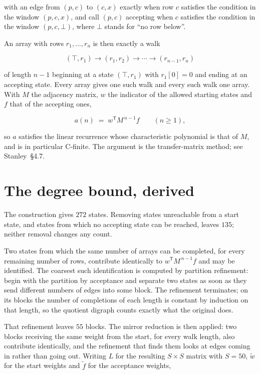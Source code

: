 \documentclass[11pt]{article}
\theoremstyle{definition}
\begin{document}
with an edge from $(p,c)$ to $(c,x)$ exactly when row $c$ satisfies the condition in the window $(p,c,x)$, and call $(p,c)$ accepting when $c$ satisfies the condition in the window $(p,c,\bot)$, where $\bot$ stands for ``no row below''.

An array with rows $r_1,\dots,r_n$ is then exactly a walk

\[(\top,r_1) \to (r_1,r_2) \to \cdots \to (r_{n-1},r_n)\]

of length $n-1$ beginning at a state $(\top,r_1)$ with $r_1[0]=0$ and ending at an accepting state. Every array gives one such walk and every such walk one array. With $M$ the adjacency matrix, $w$ the indicator of the allowed starting states and $f$ that of the accepting ones,

\[a(n) \;=\; w^{\mathsf T} M^{\,n-1} f \qquad (n \ge 1),\]

so $a$ satisfies the linear recurrence whose characteristic polynomial is that of $M$, and is in particular C-finite. The argument is the transfer-matrix method; see Stanley~\S4.7.

\section{The degree bound, derived}

The construction gives $272$ states. Removing states unreachable from a start state, and states from which no accepting state can be reached, leaves $135$; neither removal changes any count.

Two states from which the same number of arrays can be completed, for every remaining number of rows, contribute identically to $w^{\mathsf T}M^{\,n-1}f$ and may be identified. The coarsest such identification is computed by partition refinement: begin with the partition by acceptance and separate two states as soon as they send different numbers of edges into some block. The refinement terminates; on its blocks the number of completions of each length is constant by induction on that length, so the quotient digraph counts exactly what the original does.

That refinement leaves $55$ blocks. The mirror reduction is then applied: two blocks receiving the same weight from the start, for every walk length, also contribute identically, and the refinement that finds them looks at edges coming in rather than going out. Writing $L$ for the resulting $S \times S$ matrix with $S = 50$, $\tilde w$ for the start weights and $\tilde f$ for the acceptance weights,
\end{document}
